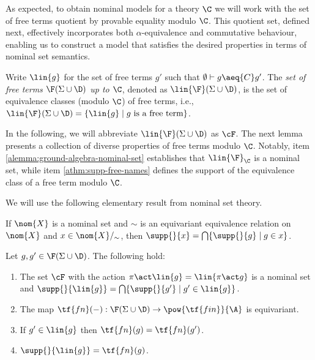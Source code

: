 As expected, to obtain nominal models for a theory $\C$ we will work with the set of free terms quotient by provable equality modulo $\C$. 
%
This quotient set, defined next, effectively incorporates both $\alpha$-equivalence and commutative behaviour, enabling us to construct a model that satisfies the desired properties in terms of nominal set semantics.

\begin{definition}
Write $\lin{g}$ for the set of free terms $g'$ such that $\emptyset\vdash g \aeq{C} g'$.
The {\em set of free terms $\F(\Sigma\cup \D)$ up to $\C$}, denoted as  $\lin{\F}(\Sigma\cup \D)$, is the set of equivalence classes (modulo $\C$) of free terms, i.e.,  $\lin{\F}(\Sigma\cup \D)=\{\lin{g} \mid g \text{ is a free term}\}$.
\end{definition}

In the following, we will abbreviate $\lin{\F}(\Sigma\cup \D)$ as  $\cF$. The next lemma presents a collection of diverse properties of free terms modulo $\C$. Notably, item \ref{alemma:ground-algebra-nominal-set} establishes that $\lin{\F}_{\C}$ is a nominal set, while item \ref{athm:supp-free-names} defines the support of the equivalence class of a free term modulo $\C$.

We will use the following elementary result from nominal set theory. 
\begin{lemma}\label{alemma:quotient-nominal}
    If $\nom{X}$ is a nominal set and $\sim$ is an equivariant equivalence relation on $\nom{X}$ and $x \in \nom{X}/_{\sim}$, then $\supp{}{x} = \bigcap\{\supp{}{g}\mid g\in x\}$.
\end{lemma}

\begin{lemma}[Properties of $\cF$]\label{alemma:ground-algebra-properties} Let $g,g'\in \F(\Sigma\cup \D)$. The following hold: \hfill

   \begin{enumerate}
    \item \label{alemma:ground-algebra-nominal-set} The set $\cF$ with the action $\pi\act\lin{g} = \lin{\pi\act g}$ is a nominal set and $\supp{}{\lin{g}} = \bigcap\{\supp{}{g'}\mid g'\in \lin{g}\}$.
    \item  \label{alemma:free-names-equivariant} The map $\tf{fn}(-):\F(\Sigma\cup \D) \to \pow{\tf{fin}}{\A}$ is equivariant.
    \item \label{alemma:free-names-preserve} If $g' \in \lin{g}$  then $\tf{fn}(g) = \tf{fn}(g')$.
    \item  \label{athm:supp-free-names} $\supp{}{\lin{g}} = \tf{fn}(g)$.
    \end{enumerate}
\end{lemma}

